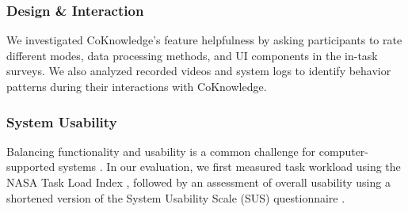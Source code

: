 \subsubsection*{Design \& Interaction}

We investigated CoKnowledge's feature helpfulness by asking participants to rate different modes, data processing methods, and UI components in the in-task surveys. We also analyzed recorded videos and system logs to identify behavior patterns during their interactions with CoKnowledge.

\subsubsection*{System Usability}

Balancing functionality and usability is a common challenge for computer-supported systems \cite{kang2021metamap,goodwin1987functionality}. In our evaluation, we first measured task workload using the NASA Task Load Index \cite{hart1988development}, followed by an assessment of overall usability using a shortened version of the System Usability Scale (SUS) questionnaire \cite{brooke1996sus}.

